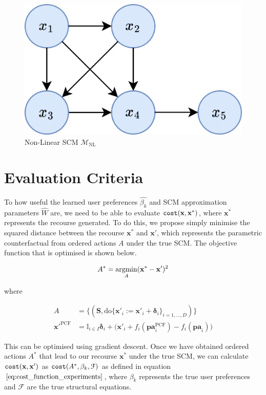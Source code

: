 \begin{figure}[!htb]
	\centering
	\includegraphics[width=0.5\linewidth]{images/draw.io/non_linear_scm.png}
	\caption{Non-Linear SCM $\mathcal{M}_{\text{NL}}$}
	\label{fig:non_linear_scm}
\end{figure}


\section{Evaluation Criteria}

To how useful the learned user preferences $\hat{\beta_k}$ and SCM approximation parameters $\hat{W}$ are, we need to be able to evaluate $\operatorname*{\texttt{cost}}(\mathbf{x,x}^*)$, where $\mathbf{x}^*$ represents the recourse generated. To do this, we propose simply minimise the squared distance between the recourse $\mathbf{x}^*$ and $\mathbf{x}'$, which represents the parametric counterfactual from ordered actions $A$ under the true SCM. The objective function that is optimised is shown below.

\begin{equation}
	A^* = \operatorname*{argmin}_{A} (\mathbf{x}^* - \mathbf{x}')^2
\end{equation}

where

\begin{align}
	A & = \big\{(\mathbf{S}, \text{do} \{\mathbf{x}'_i:=\mathbf{x}'_i + \boldsymbol{\delta}_i\}_{i=1, \ldots, D})\big\} \\ \nonumber
	{\mathbf{x}'}^{\text{PCF}} & = \mathbb{I}_{i \in I} \boldsymbol{\delta}_i + \bigg( \mathbf{x}'_i + f_i(\textbf{pa}^{\text{PCF}}_i) - f_i(\textbf{pa}_i) \bigg)
\end{align}

This can be optimised using gradient descent. Once we have obtained ordered actions $A^*$ that lead to our recourse $\mathbf{x}^*$ under the true SCM, we can calculate $\operatorname*{\texttt{cost}}(\mathbf{x,x}')$ as $\operatorname*{\texttt{cost}}(A^*, \beta_k, \mathcal{F})$ as defined in equation $\ref{eq:cost_function_experiments}$, where $\beta_k$ represents the true user preferences and $\mathcal{F}$ are the true structural equations.

